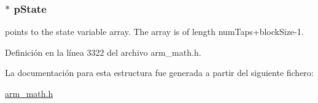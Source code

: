 \subsubsection[{\texorpdfstring{p\+State}{pState}}]{$\ast$ p\+State}\hypertarget{structarm__fir__decimate__instance__q15_ae29dfdb736374fcddaeaec4b7770170c}{}\label{structarm__fir__decimate__instance__q15_ae29dfdb736374fcddaeaec4b7770170c}
points to the state variable array. The array is of length num\+Taps+block\+Size-\/1. 

Definición en la línea 3322 del archivo arm\+\_\+math.\+h.



La documentación para esta estructura fue generada a partir del siguiente fichero\+:\begin{DoxyCompactItemize}
\item 
\hyperlink{arm__math_8h}{arm\+\_\+math.\+h}\end{DoxyCompactItemize}
